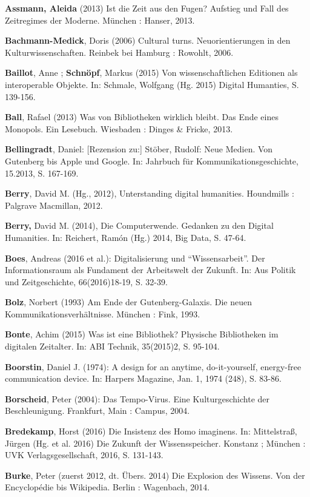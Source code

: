\documentclass[a4paper,
fontsize=11pt,
oneside,
numbers=noperiodatend,
parskip=half-,
bibliography=totoc,
final
]{scrartcl}
\begin{document}
\textbf{Assmann, Aleida} (2013) Ist die Zeit aus den Fugen? Aufstieg und
Fall des Zeitregimes der Moderne. München : Hanser, 2013.

\textbf{Bachmann-Medick}, Doris (2006) Cultural turns. Neuorientierungen
in den Kulturwissenschaften. Reinbek bei Hamburg : Rowohlt, 2006.

\textbf{Baillot}, Anne ; \textbf{Schnöpf}, Markus (2015) Von
wissenschaftlichen Editionen als interoperable Objekte. In: Schmale,
Wolfgang (Hg. 2015) Digital Humanties, S. 139-156.

\textbf{Ball}, Rafael (2013) Was von Bibliotheken wirklich bleibt. Das
Ende eines Monopols. Ein Lesebuch. Wiesbaden : Dinges \& Fricke, 2013.

\textbf{Bellingradt}, Daniel: {[}Rezension zu:{]} Stöber, Rudolf: Neue
Medien. Von Gutenberg bis Apple und Google. In: Jahrbuch für
Kommunikationsgeschichte, 15.2013, S. 167-169.

\textbf{Berry}, David M. (Hg., 2012), Unterstanding digital humanities.
Houndmills : Palgrave Macmillan, 2012.

\textbf{Berry,} David M. (2014), Die Computerwende. Gedanken zu den
Digital Humanities. In: Reichert, Ramón (Hg.) 2014, Big Data, S. 47-64.

\textbf{Boes}, Andreas (2016 et al.): Digitalisierung und
\enquote{Wissensarbeit}. Der Informationsraum als Fundament der
Arbeitswelt der Zukunft. In: Aus Politik und Zeitgeschichte,
66(2016)18-19, S. 32-39.

\textbf{Bolz}, Norbert (1993) Am Ende der Gutenberg-Galaxis. Die neuen
Kommunikationsverhältnisse. München : Fink, 1993.

\textbf{Bonte}, Achim (2015) Was ist eine Bibliothek? Physische
Bibliotheken im digitalen Zeitalter. In: ABI Technik, 35(2015)2, S.
95-104.

\textbf{Boorstin}, Daniel J. (1974): A design for an anytime,
do-it-yourself, energy-free communication device. In: Harpers Magazine,
Jan. 1, 1974 (248), S. 83-86.

\textbf{Borscheid}, Peter (2004): Das Tempo-Virus. Eine Kulturgeschichte
der Beschleunigung. Frankfurt, Main : Campus, 2004.

\textbf{Bredekamp}, Horst (2016) Die Insistenz des Homo imaginens. In:
Mittelstraß, Jürgen (Hg. et al. 2016) Die Zukunft der Wissensspeicher.
Konstanz ; München : UVK Verlagsgesellschaft, 2016, S. 131-143.

\textbf{Burke}, Peter (zuerst 2012, dt. Übers. 2014) Die Explosion des
Wissens. Von der Encyclopédie bis Wikipedia. Berlin : Wagenbach, 2014.
\end{document}
